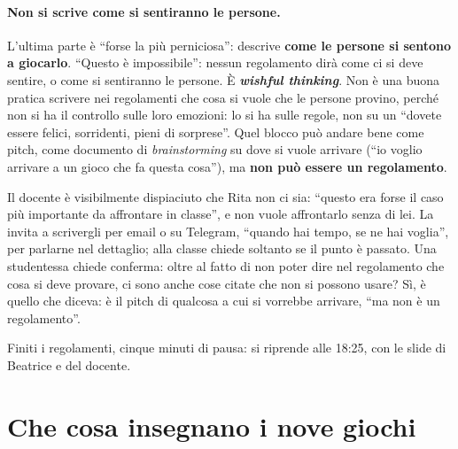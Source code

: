 \paragraph{Non si scrive come si sentiranno le persone.} L'ultima parte è ``forse la
più perniciosa'': descrive \textbf{come le persone si sentono a giocarlo}. ``Questo è
impossibile'': nessun regolamento dirà come ci si deve sentire, o come si sentiranno
le persone. È \textbf{\emph{wishful thinking}}. Non è una buona pratica scrivere nei
regolamenti che cosa si vuole che le persone provino, perché non si ha il controllo
sulle loro emozioni: lo si ha sulle regole, non su un ``dovete essere felici,
sorridenti, pieni di sorprese''. Quel blocco può andare bene come pitch, come
documento di \emph{brainstorming} su dove si vuole arrivare (``io voglio arrivare a
un gioco che fa questa cosa''), ma \textbf{non può essere un regolamento}.

Il docente è visibilmente dispiaciuto che Rita non ci sia: ``questo era forse il caso
più importante da affrontare in classe'', e non vuole affrontarlo senza di lei. La
invita a scrivergli per email o su Telegram, ``quando hai tempo, se ne hai voglia'',
per parlarne nel dettaglio; alla classe chiede soltanto se il punto è passato. Una
studentessa chiede conferma: oltre al fatto di non poter dire nel regolamento che cosa
si deve provare, ci sono anche cose citate che non si possono usare? Sì, è quello che
diceva: è il pitch di qualcosa a cui si vorrebbe arrivare, ``ma non è un regolamento''.

Finiti i regolamenti, cinque minuti di pausa: si riprende alle 18:25, con le slide di
Beatrice e del docente.

\section{Che cosa insegnano i nove giochi}
\label{a6:sec:lezioni-giochi}

